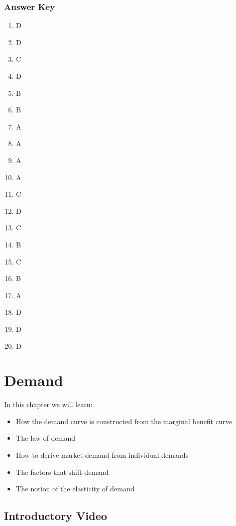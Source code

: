 \documentclass[
]{book}
\providecommand{\tightlist}{%
  \setlength{\itemsep}{0pt}\setlength{\parskip}{0pt}}
\begin{document}
\hypertarget{answer-key-2}{%
\subsection{Answer Key}\label{answer-key-2}}

\begin{enumerate}
\def\labelenumi{\arabic{enumi}.}
\tightlist
\item
  D
\item
  D
\item
  C
\item
  D
\item
  B
\item
  B
\item
  A
\item
  A
\item
  A
\item
  A
\item
  C
\item
  D
\item
  C
\item
  B
\item
  C
\item
  B
\item
  A
\item
  D
\item
  D
\item
  D
\end{enumerate}

\hypertarget{demand}{%
\chapter{Demand}\label{demand}}

In this chapter we will learn:

\begin{itemize}
\tightlist
\item
  How the demand curve is constructed from the marginal benefit curve
\item
  The law of demand
\item
  How to derive market demand from individual demands\\
\item
  The factors that shift demand
\item
  The notion of the elasticity of demand
\end{itemize}

\hypertarget{introductory-video}{%
\section{Introductory Video}\label{introductory-video}}
\end{document}
